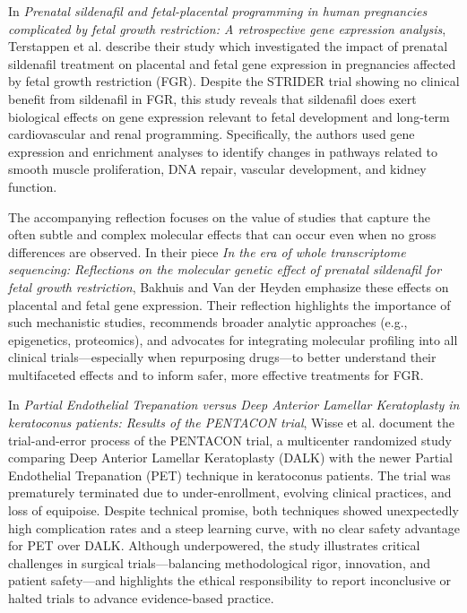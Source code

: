 \documentclass[authordate, empirical, issue]{jote-new-article}
\begin{document}
	In \emph{Prenatal sildenafil and fetal-placental programming in human pregnancies complicated by fetal growth restriction: A retrospective gene expression analysis}, Terstappen et al. describe their study which investigated the impact of prenatal sildenafil treatment on placental and fetal gene expression in pregnancies affected by fetal growth restriction (FGR). Despite the STRIDER trial showing no clinical benefit from sildenafil in FGR, this study reveals that sildenafil does exert biological effects on gene expression relevant to fetal development and long-term cardiovascular and renal programming. Specifically, the authors used gene expression and enrichment analyses to identify changes in pathways related to smooth muscle proliferation, DNA repair, vascular development, and kidney function.



	The accompanying reflection focuses on the value of studies that capture the often subtle and complex molecular effects that can occur even when no gross differences are observed. In their piece \emph{In the era of whole transcriptome sequencing: Reflections on the molecular genetic effect of prenatal sildenafil for fetal growth restriction}, Bakhuis and Van der Heyden emphasize these effects on placental and fetal gene expression. Their reflection highlights the importance of such mechanistic studies, recommends broader analytic approaches (e.g., epigenetics, proteomics), and advocates for integrating molecular profiling into all clinical trials—especially when repurposing drugs—to better understand their multifaceted effects and to inform safer, more effective treatments for FGR.



	In \emph{Partial Endothelial Trepanation versus Deep Anterior Lamellar Keratoplasty in keratoconus patients: Results of the PENTACON trial}, Wisse et al. document the trial-and-error process of the PENTACON trial, a multicenter randomized study comparing Deep Anterior Lamellar Keratoplasty (DALK) with the newer Partial Endothelial Trepanation (PET) technique in keratoconus patients. The trial was prematurely terminated due to under-enrollment, evolving clinical practices, and loss of equipoise. Despite technical promise, both techniques showed unexpectedly high complication rates and a steep learning curve, with no clear safety advantage for PET over DALK. Although underpowered, the study illustrates critical challenges in surgical trials—balancing methodological rigor, innovation, and patient safety—and highlights the ethical responsibility to report inconclusive or halted trials to advance evidence-based practice.
\end{document}

